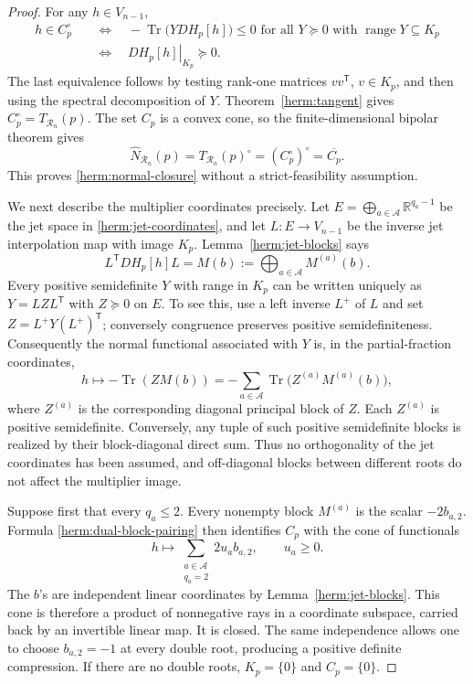 \documentclass[reqno]{amsart}
\theoremstyle{definition}
\theoremstyle{remark}
\newcommand{\R}{\mathbb R}
\DeclareMathOperator{\Tr}{Tr}
\begin{document}
\begin{proof}
For any $h\in V_{n-1}$,
\begin{align*}
 h\in C_p^\circ
 &\quad\Longleftrightarrow\quad
   -\Tr\bigl(YDH_p[h]\bigr)\leq0
      \text{ for all }Y\succeq0
      \text{ with }\operatorname{range}Y\subseteq K_p\\
 &\quad\Longleftrightarrow\quad
   \left.DH_p[h]\right|_{K_p}\succeq0.
\end{align*}
The last equivalence follows by testing rank-one matrices $vv^{\mathsf T}$,
$v\in K_p$, and then using the spectral decomposition of $Y$.
Theorem~\ref{herm:tangent} gives $C_p^\circ=T_{\mathcal R_n}(p)$.
The set $C_p$ is a convex cone, so the finite-dimensional bipolar
theorem gives
\[
 \widehat N_{\mathcal R_n}(p)
       =T_{\mathcal R_n}(p)^\circ
       =(C_p^\circ)^\circ=\overline{C_p}.
\]
This proves \eqref{herm:normal-closure} without a strict-feasibility
assumption.

We next describe the multiplier coordinates precisely.  Let
$E=\bigoplus_{a\in\mathcal A}\R^{q_a-1}$ be the jet space in
\eqref{herm:jet-coordinates}, and let $L:E\to V_{n-1}$ be the inverse
jet interpolation map with image $K_p$.  Lemma~\ref{herm:jet-blocks}
says
\begin{equation}
 L^{\mathsf T}DH_p[h]L
       =M(b):=\bigoplus_{a\in\mathcal A}M^{(a)}(b).
 \label{herm:congruence}
\end{equation}
Every positive semidefinite $Y$ with range in $K_p$ can be written
uniquely as $Y=LZL^{\mathsf T}$ with $Z\succeq0$ on $E$.
To see this, use a left inverse $L^+$ of $L$ and set
$Z=L^+Y(L^+)^{\mathsf T}$; conversely congruence preserves positive
semidefiniteness.  Consequently the normal functional associated with
$Y$ is, in the partial-fraction coordinates,
\begin{equation}
 h\longmapsto-\Tr(ZM(b))
       =-\sum_{a\in\mathcal A}\Tr\bigl(Z^{(a)}M^{(a)}(b)\bigr),
 \label{herm:dual-block-pairing}
\end{equation}
where $Z^{(a)}$ is the corresponding diagonal principal block of $Z$.
Each $Z^{(a)}$ is positive semidefinite.  Conversely, any tuple of such
positive semidefinite blocks is realized by their block-diagonal direct
sum.  Thus no orthogonality of the jet coordinates has been assumed,
and off-diagonal blocks between different roots do not affect the
multiplier image.

Suppose first that every $q_a\leq2$.  Every nonempty block $M^{(a)}$ is
the scalar $-2b_{a,2}$.  Formula \eqref{herm:dual-block-pairing} then
identifies $C_p$ with the cone of functionals
\[
 h\longmapsto
       \sum_{\substack{a\in\mathcal A\\q_a=2}}
                         2u_a b_{a,2},\qquad u_a\geq0.
\]
The $b$'s are independent linear coordinates by
Lemma~\ref{herm:jet-blocks}.  This cone is therefore a product of
nonnegative rays in a coordinate subspace, carried back by an
invertible linear map.  It is closed.  The same independence allows
one to choose $b_{a,2}=-1$ at every double root, producing a positive
definite compression.  If there are no double roots, $K_p=\{0\}$ and
$C_p=\{0\}$.


\end{proof}
\end{document}
